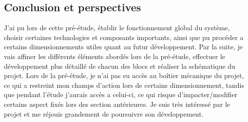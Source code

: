 \newpage


\subsection{Conclusion et perspectives} \label{ssec:PreeConc}
{

J'ai pu lors de cette pré-étude, établir le fonctionnement global du système, choisir certaines technologies et composants importants, ainsi que pu procéder a certains dimensionnements utiles quant au futur développement. 
Par la suite, je vais affiner les différents éléments abordés lors de la pré-étude, effectuer le développement plus détaillé de chacun des blocs et réaliser la schématique du projet.
Lors de la pré-étude, je n'ai pas eu accès au boîtier mécanique du projet, ce qui a restreint mon champs d'action lors de certains dimensionnement, tandis que pendant l'étude j'aurais accès a celui-ci, ce qui risque d'impacter/modifier certains aspect fixés lors des section antérieures.
Je suis très intéressé par le projet et me réjouis grandement de poursuivre son développement.

}

\clearpage
